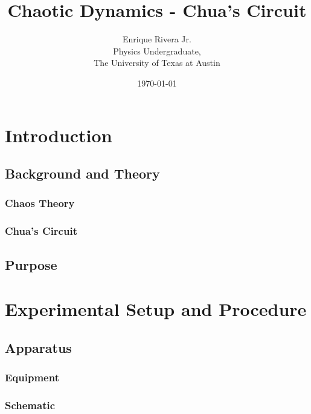 \documentclass[12pt]{article}
\title{Chaotic Dynamics - Chua's Circuit}
\author{Enrique Rivera Jr. \\
                Physics Undergraduate, \\ 
                The University of Texas at Austin}
\date{\today}
\begin{document}
\maketitle

\begin{abstract}

\end{abstract}

\section{Introduction}
        \subsection{Background and Theory}

                \subsubsection{Chaos Theory} 
                

                \subsubsection{Chua's Circuit}


        \subsection{Purpose}


\section{Experimental Setup and Procedure}
        \subsection{Apparatus}
                \subsubsection{Equipment}

                \subsubsection{Schematic}
                
\end{document}

